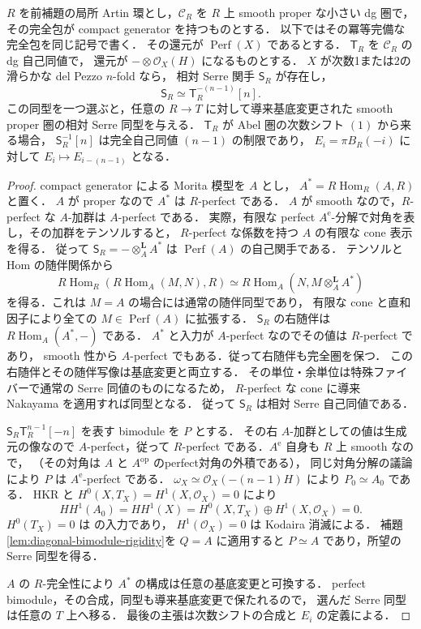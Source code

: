 \begin{proposition}
\label{prop:serre-from-smooth-proper-lift}
$R$ を前補題の局所 Artin 環とし，$\mathcal C_R$ を
$R$ 上 smooth proper な小さい dg 圏で，その完全包が compact generator を持つものとする．
以下ではその冪等完備な完全包を同じ記号で書く．
その還元が $\operatorname{Perf}(X)$ であるとする．
$\mathsf T_R$ を $\mathcal C_R$ の dg 自己同値で，
還元が $-\otimes\mathcal O_X(H)$ になるものとする．
$X$ が次数1または2の滑らかな del Pezzo $n$-fold なら，
相対 Serre 関手 $\mathsf S_R$ が存在し，
\[
 \mathsf S_R\simeq\mathsf T_R^{-(n-1)}[n].
\]
この同型を一つ選ぶと，任意の $R\to T$ に対して導来基底変更された
smooth proper 圏の相対 Serre 同型を与える．
$\mathsf T_R$ が Abel 圏の次数シフト $(1)$ から来る場合，
$\mathsf S_R^{-1}[n]$ は完全自己同値 $(n-1)$ の制限であり，
$E_i=\pi B_R(-i)$ に対して $E_i\mapsto E_{i-(n-1)}$ となる．
\end{proposition}
\begin{proof}
compact generator による Morita 模型を $A$ とし，
$A^*=R\operatorname{Hom}_R(A,R)$ と置く．
$A$ が proper なので $A^*$ は $R$-perfect である．
$A$ が smooth なので，$R$-perfect な $A$-加群は $A$-perfect である．
実際，有限な perfect $A^{\mathrm e}$-分解で対角を表し，その加群をテンソルすると，
$R$-perfect な係数を持つ $A$ の有限な cone 表示を得る．
従って $\mathsf S_R=-\otimes_A^{\mathbf L}A^*$ は
$\operatorname{Perf}(A)$ の自己関手である．
テンソルと Hom の随伴関係から
\[
 R\operatorname{Hom}_R(R\operatorname{Hom}_A(M,N),R)
 \simeq R\operatorname{Hom}_A
 (N,M\otimes_A^{\mathbf L}A^*)
\]
を得る．これは $M=A$ の場合には通常の随伴同型であり，
有限な cone と直和因子により全ての $M\in\operatorname{Perf}(A)$ に拡張する．
$\mathsf S_R$ の右随伴は
$R\operatorname{Hom}_A(A^*,-)$ である．
$A^*$ と入力が $A$-perfect なのでその値は $R$-perfect であり，
smooth 性から $A$-perfect でもある．従って右随伴も完全圏を保つ．
この右随伴とその随伴写像は基底変更と両立する．
その単位・余単位は特殊ファイバーで通常の Serre 同値のものになるため，
$R$-perfect な cone に導来 Nakayama を適用すれば同型となる．
従って $\mathsf S_R$ は相対 Serre 自己同値である．

$\mathsf S_R\mathsf T_R^{n-1}[-n]$ を表す bimodule を $P$ とする．
その右 $A$-加群としての値は生成元の像なので $A$-perfect，従って
$R$-perfect である．$A^{\mathrm e}$ 自身も $R$ 上 smooth なので，
（その対角は $A$ と $A^{\mathrm{op}}$ のperfect対角の外積である），
同じ対角分解の議論により $P$ は $A^{\mathrm e}$-perfect である．
$\omega_X\simeq\mathcal O_X(-(n-1)H)$ により $P_0\simeq A_0$ である．
HKR と $H^0(X,T_X)=H^1(X,\mathcal O_X)=0$ により
\[
 HH^1(A_0)=HH^1(X)
 =H^0(X,T_X)\oplus H^1(X,\mathcal O_X)=0.
\]
$H^0(T_X)=0$ は \cite[補題8.7]{PoissonDP} の入力であり，
$H^1(\mathcal O_X)=0$ は Kodaira 消滅による．
補題\ref{lem:diagonal-bimodule-rigidity}を $Q=A$ に適用すると
$P\simeq A$ であり，所望の Serre 同型を得る．

$A$ の $R$-完全性により $A^*$ の構成は任意の基底変更と可換する．
perfect bimodule，その合成，同型も導来基底変更で保たれるので，
選んだ Serre 同型は任意の $T$ 上へ移る．
最後の主張は次数シフトの合成と $E_i$ の定義による．
\end{proof}

